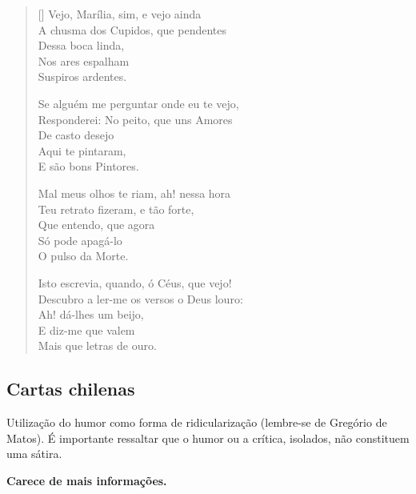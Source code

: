 \begin{enumerate}
\begin{verse}[\versewidth]
Vejo, Marília, sim, e vejo ainda \\
A chusma dos Cupidos, que pendentes \\
\hspace{2em} Dessa boca linda, \\
\hspace{2em} Nos ares espalham \\
\hspace{2em} Suspiros ardentes.
						
Se alguém me perguntar onde eu te vejo, \\
Responderei: No peito, que uns Amores \\
\hspace{2em} De casto desejo \\
\hspace{2em} Aqui te pintaram, \\
\hspace{2em} E são bons Pintores.
						
Mal meus olhos te riam, ah! nessa hora \\
Teu retrato fizeram, e tão forte, \\
\hspace{2em} Que entendo, que agora \\
\hspace{2em} Só pode apagá-lo \\
\hspace{2em} O pulso da Morte.
						
Isto escrevia, quando, ó Céus, que vejo! \\
Descubro a ler-me os versos o Deus louro: \\
\hspace{2em} Ah! dá-lhes um beijo, \\
\hspace{2em} E diz-me que valem \\
\hspace{2em} Mais que letras de ouro.
\end{verse}
\end{enumerate}

\subsection{Cartas chilenas}

Utilização do humor como forma de ridicularização (lembre-se de Gregório de Matos). É importante ressaltar que o humor ou a crítica, isolados, não constituem uma sátira.

\textbf{Carece de mais informações.}

